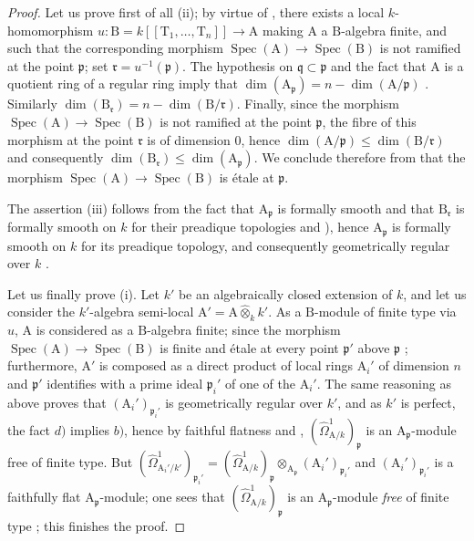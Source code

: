 \begin{proof}
Let us prove first of all (ii); by virtue of , there exists a local $k$-homomorphism $u:\mathrm{B}=k[[\mathrm{T}_1,\ldots,\mathrm{T}_n]]\to\mathrm{A}$ making $\mathrm{A}$ a $\mathrm{B}$-algebra finite, and such that the corresponding morphism $\operatorname{Spec}(\mathrm{A})\to\operatorname{Spec}(\mathrm{B})$ is not ramified at the point $\mathfrak{p}$; set $\mathfrak{r}=u^{-1}(\mathfrak{p})$.
The hypothesis on $\mathfrak{q}\subset\mathfrak{p}$ and the fact that $\mathrm{A}$ is a quotient ring of a regular ring  imply that $\dim(\mathrm{A}_\mathfrak{p})=n-\dim(\mathrm{A}/\mathfrak{p})$ .
Similarly $\dim(\mathrm{B}_\mathfrak{r})=n-\dim(\mathrm{B}/\mathfrak{r})$.
Finally, since the morphism $\operatorname{Spec}(\mathrm{A})\to\operatorname{Spec}(\mathrm{B})$ is not ramified at the point $\mathfrak{p}$, the fibre of this morphism at the point $\mathfrak{r}$ is of dimension $0$, hence  $\dim(\mathrm{A}/\mathfrak{p})\leq\dim(\mathrm{B}/\mathfrak{r})$ and consequently $\dim(\mathrm{B}_\mathfrak{r})\leq\dim(\mathrm{A}_\mathfrak{p})$.
We conclude therefore from  that the morphism $\operatorname{Spec}(\mathrm{A})\to\operatorname{Spec}(\mathrm{B})$ is \'etale at $\mathfrak{p}$.

The assertion (iii) follows from the fact that $\mathrm{A}_\mathfrak{p}$ is formally smooth and that $\mathrm{B}_\mathfrak{r}$ is formally smooth on $k$ for their preadique topologies  and ), hence $\mathrm{A}_\mathfrak{p}$ is formally smooth on $k$ for its preadique topology, and consequently geometrically regular over $k$ .

Let us finally prove (i).
Let $k'$ be an algebraically closed extension of $k$, and let us consider the $k'$-algebra semi-local $\mathrm{A}'=\mathrm{A}\widehat{\otimes}_kk'$.
As a $\mathrm{B}$-module of finite type via $u$, $\mathrm{A}$ is considered as a $\mathrm{B}$-algebra finite; since the morphism $\operatorname{Spec}(\mathrm{A})\to\operatorname{Spec}(\mathrm{B})$ is finite and \'etale at every point $\mathfrak{p}'$ above $\mathfrak{p}$ ; furthermore, $\mathrm{A}'$ is composed as a direct product of local rings $\mathrm{A}_i'$ of dimension $n$  and $\mathfrak{p}'$ identifies with a prime ideal $\mathfrak{p}_i'$ of one of the $\mathrm{A}_i'$.
The same reasoning as above proves that $(\mathrm{A}_i')_{\mathfrak{p}_i'}$ is geometrically regular over $k'$, and as $k'$ is perfect, the fact $d)$ implies $b)$, hence by faithful flatness  and , $(\hat{\Omega}^1_{\mathrm{A}/k})_\mathfrak{p}$ is an $\mathrm{A}_\mathfrak{p}$-module free of finite type.
But $(\hat{\Omega}^1_{\mathrm{A}_i'/k'})_{\mathfrak{p}_i'}=(\hat{\Omega}^1_{\mathrm{A}/k})_\mathfrak{p}\otimes_{\mathrm{A}_\mathfrak{p}}(\mathrm{A}_i')_{\mathfrak{p}_i'}$  and $(\mathrm{A}_i')_{\mathfrak{p}_i'}$ is a faithfully flat $\mathrm{A}_\mathfrak{p}$-module; one sees that $(\hat{\Omega}^1_{\mathrm{A}/k})_\mathfrak{p}$ is an $\mathrm{A}_\mathfrak{p}$-module \emph{free} of finite type ; this finishes the proof.
\end{proof}

